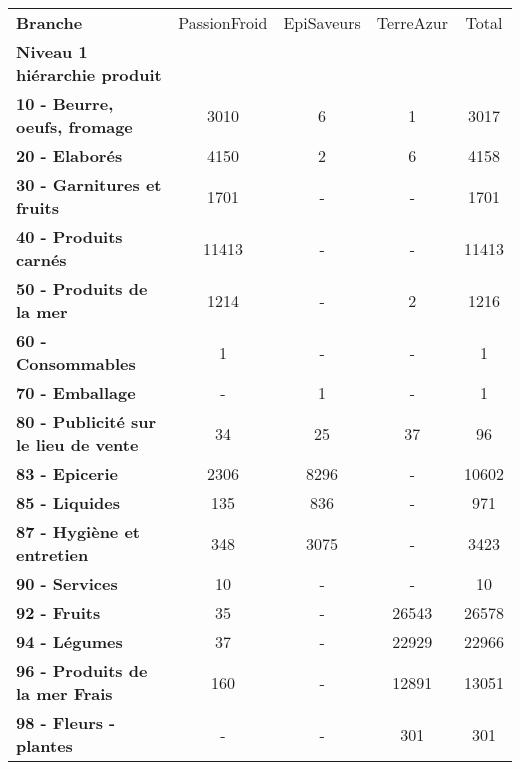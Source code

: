 \begin{tabular}{lcccc}
\toprule
\textbf{Branche} & PassionFroid & EpiSaveurs & TerreAzur &  Total \\
\textbf{Niveau 1 hiérarchie produit        } &              &            &           &        \\
\midrule
\textbf{10 - Beurre, oeufs, fromage        } &         3010 &          6 &         1 &   3017 \\
\textbf{20 - Elaborés                      } &         4150 &          2 &         6 &   4158 \\
\textbf{30 - Garnitures et fruits          } &         1701 &          - &         - &   1701 \\
\textbf{40 - Produits carnés               } &        11413 &          - &         - &  11413 \\
\textbf{50 - Produits de la mer            } &         1214 &          - &         2 &   1216 \\
\textbf{60 - Consommables                  } &            1 &          - &         - &      1 \\
\textbf{70 - Emballage                     } &            - &          1 &         - &      1 \\
\textbf{80 - Publicité sur le lieu de vente} &           34 &         25 &        37 &     96 \\
\textbf{83 - Epicerie                      } &         2306 &       8296 &         - &  10602 \\
\textbf{85 - Liquides                      } &          135 &        836 &         - &    971 \\
\textbf{87 - Hygiène et entretien          } &          348 &       3075 &         - &   3423 \\
\textbf{90 - Services                      } &           10 &          - &         - &     10 \\
\textbf{92 - Fruits                        } &           35 &          - &     26543 &  26578 \\
\textbf{94 - Légumes                       } &           37 &          - &     22929 &  22966 \\
\textbf{96 - Produits de la mer Frais      } &          160 &          - &     12891 &  13051 \\
\textbf{98 - Fleurs - plantes              } &            - &          - &       301 &    301 \\
\bottomrule
\end{tabular}
